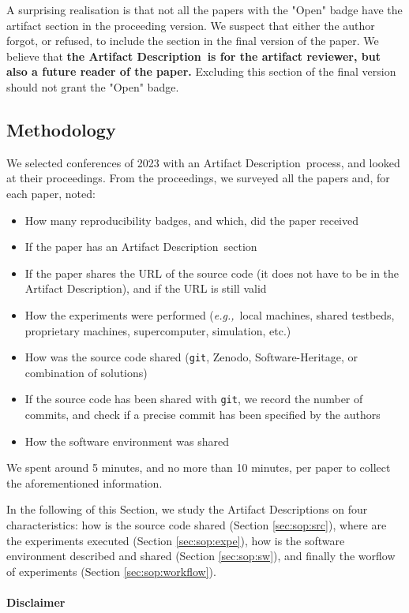 \documentclass[sigconf,natbib=false]{acmart}
\newcommand{\eg}{\emph{e.g.,}}
\newcommand{\ad}{Artifact Description}
\begin{document}
A surprising realisation is that not all the papers with the "Open" badge have the artifact section in the proceeding version.
We suspect that either the author forgot, or refused, to include the section in the final version of the paper.
We believe that \textbf{the \ad\ is for the artifact reviewer, but also a future reader of the paper.}
Excluding this section of the final version should not grant the "Open" badge.

\subsection{Methodology}

We selected conferences of 2023 with an \ad\ process, and looked at their proceedings.
From the proceedings, we surveyed all the papers and, for each paper, noted:

\begin{itemize}
  \item How many reproducibility badges, and which, did the paper received
  \item If the paper has an \ad\ section
  \item If the paper shares the URL of the source code (it does not have to be in the \ad), and if the URL is still valid
  \item How the experiments were performed (\eg\ local machines, shared testbeds, proprietary machines, supercomputer, simulation, etc.)
  \item How was the source code shared (\texttt{git}, Zenodo, Software-Heritage, or combination of solutions)
  \item If the source code has been shared with \texttt{git}, we record the number of commits, and check if a precise commit has been specified by the authors
  \item How the software environment was shared
\end{itemize}

We spent around 5 minutes, and no more than 10 minutes, per paper to collect the aforementioned information.


In the following of this Section, we study the \ad s on four characteristics: how is the source code shared (Section \ref{sec:sop:src}), where are the experiments executed (Section \ref{sec:sop:expe}), how is the software environment described and shared (Section \ref{sec:sop:sw}), and finally the worflow of experiments (Section \ref{sec:sop:workflow}).

\paragraph{Disclaimer}
\end{document}
